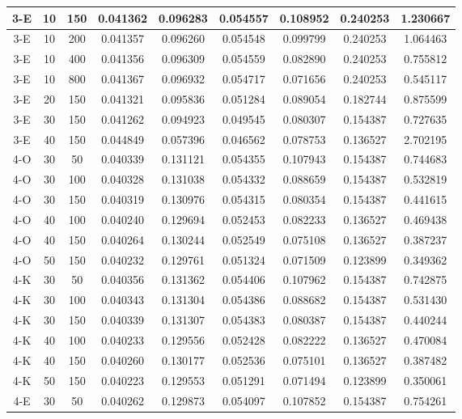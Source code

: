 \begin{center}
\begin{longtable}{|c|c|c|c|c|c|c|c|c|}
	\hline 3-E &	10 &	150	&	0.041362 &	0.096283 &	0.054557 &	0.108952 &	0.240253 &	1.230667 \\
	\hline 3-E &	10 &	200	&	0.041357 &	0.096260 &	0.054548 &	0.099799 &	0.240253 &	1.064463 \\
	\hline 3-E &	10 &	400	&	0.041356 &	0.096309 &	0.054559 &	0.082890 &	0.240253 &	0.755812 \\
	\hline \rowcolor{bad} 3-E &	10 &	800	&	0.041367 &	0.096932 &	0.054717 &	0.071656 &	0.240253 &	0.545117 \\
	\hline 3-E &	20 &	150	&	0.041321 &	0.095836 &	0.051284 &	0.089054 &	0.182744 &	0.875599 \\
	\hline 3-E &	30 &	150	&	0.041262 &	0.094923 &	0.049545 &	0.080307 &	0.154387 &	0.727635 \\
	\hline \rowcolor{bad} 3-E &	40 &	150	&	0.044849 &	0.057396 &	0.046562 &	0.078753 &	0.136527 &	2.702195 \\
	\hline 4-O &	30 &	50	&	0.040339 &	0.131121 &	0.054355 &	0.107943 &	0.154387 &	0.744683 \\
	\hline 4-O &	30 &	100	&	0.040328 &	0.131038 &	0.054332 &	0.088659 &	0.154387 &	0.532819 \\
	\hline 4-O &	30 &	150	&	0.040319 &	0.130976 &	0.054315 &	0.080354 &	0.154387 &	0.441615 \\
	\hline 4-O &	40 &	100	&	0.040240 &	0.129694 &	0.052453 &	0.082233 &	0.136527 &	0.469438 \\
	\hline 4-O &	40 &	150	&	0.040264 &	0.130244 &	0.052549 &	0.075108 &	0.136527 &	0.387237 \\
	\hline \rowcolor{acceptable} 4-O &	50 &	150	&	0.040232 &	0.129761 &	0.051324 &	0.071509 &	0.123899 &	0.349362 \\
	\hline 4-K &	30 &	50	&	0.040356 &	0.131362 &	0.054406 &	0.107962 &	0.154387 &	0.742875 \\
	\hline 4-K &	30 &	100	&	0.040343 &	0.131304 &	0.054386 &	0.088682 &	0.154387 &	0.531430 \\
	\hline 4-K &	30 &	150	&	0.040339 &	0.131307 &	0.054383 &	0.080387 &	0.154387 &	0.440244 \\
	\hline 4-K &	40 &	100	&	0.040233 &	0.129556 &	0.052428 &	0.082222 &	0.136527 &	0.470084 \\
	\hline 4-K &	40 &	150	&	0.040260 &	0.130177 &	0.052536 &	0.075101 &	0.136527 &	0.387482 \\
	\hline \rowcolor{acceptable} 4-K &	50 &	150	&	0.040223 &	0.129553 &	0.051291 &	0.071494 &	0.123899 &	0.350061 \\
	\hline 4-E &	30 &	50	&	0.040262 &	0.129873 &	0.054097 &	0.107852 &	0.154387 &	0.754261 \\

\end{longtable}
\end{center}
